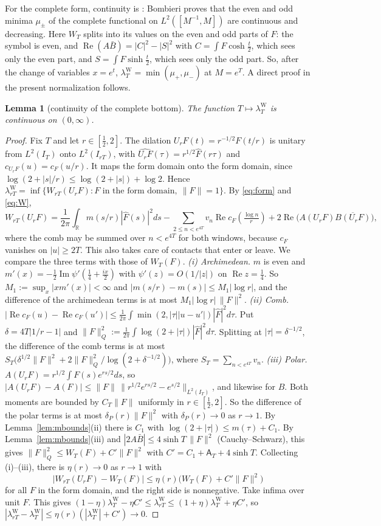 \documentclass[11pt]{amsart}
\newtheorem{lemma}[theorem]{Lemma}
\theoremstyle{definition}
\theoremstyle{remark}
\newcommand{\R}{\mathbb R}
\newcommand{\Rel}{\operatorname{Re}}
\newcommand{\Iml}{\operatorname{Im}}
\newcommand{\IT}{I_T}
\newcommand{\lamW}{\lambda^{\mathrm W}_T}
\newcommand{\Fh}{\widehat F}
\newcommand{\cF}{c_F}
\newcommand{\Aconst}{\mathsf A_T}
\begin{document}
For the complete form, continuity is \cite[Thm.~5]{Bombieri2000}:
Bombieri proves that the even and odd minima $\mu_\pm$ of the complete functional
on $L^2([M^{-1},M])$ are continuous and decreasing. Here $W_T$ splits into its values on the even and
odd parts of $F$: the symbol is even, and $\Rel(A\bar B)=|C|^2-|S|^2$ with $C=\int F\cosh\frac t2$, which
sees only the even part, and $S=\int F\sinh\frac t2$, which sees only the odd part. So, after the change of
variables $x=e^t$, $\lamW=\min(\mu_+,\mu_-)$ at $M=e^T$. A direct proof in the present normalization follows.

\begin{lemma}[continuity of the complete bottom]\label{lem:contT}
The function $T\mapsto\lamW$ is continuous on $(0,\infty)$.
\end{lemma}
\begin{proof}
Fix $T$ and let $r\in[\frac12,2]$. The dilation $U_rF(t)=r^{-1/2}F(t/r)$ is unitary from $L^2(\IT)$ onto
$L^2(I_{rT})$, with $\widehat{U_rF}(\tau)=r^{1/2}\Fh(r\tau)$ and $c_{U_rF}(u)=\cF(u/r)$. It maps the form
domain onto the form domain, since $\log(2+|s|/r)\le\log(2+|s|)+\log2$. Hence
$\lambda^{\mathrm W}_{rT}=\inf\{W_{rT}(U_rF):F\text{ in the form domain},\ \|F\|=1\}$. By \eqref{eq:form}
and \eqref{eq:W},
\[
W_{rT}(U_rF)=\frac1{2\pi}\int_\R m(s/r)|\Fh(s)|^2ds-\sum_{2\le n<e^{4T}}v_n\Rel\cF(\tfrac{\log n}r)
+2\Rel\big(A(U_rF)\overline{B(U_rF)}\big),
\]
where the comb may be summed over $n<e^{4T}$ for both windows, because $\cF$ vanishes on $|u|\ge2T$. This
also takes care of contacts that enter or leave. We compare the three terms with those of $W_T(F)$.
\emph{(i) Archimedean.} $m$ is even and $m'(x)=-\frac12\Iml\psi'(\frac14+\frac{ix}2)$ with
$\psi'(z)=O(1/|z|)$ on $\Rel z=\frac14$. So $M_1:=\sup_x|xm'(x)|<\infty$ and
$|m(s/r)-m(s)|\le M_1|\log r|$, and the difference of the archimedean terms is at most
$M_1|\log r|\,\|F\|^2$.
\emph{(ii) Comb.} $|\Rel\cF(u)-\Rel\cF(u')|\le\frac1{2\pi}\int\min(2,|\tau||u-u'|)|\Fh|^2d\tau$. Put
$\delta=4T|1/r-1|$ and $\|F\|_Q^2:=\frac1{2\pi}\int\log(2+|\tau|)|\Fh|^2d\tau$. Splitting at
$|\tau|=\delta^{-1/2}$, the difference of the comb terms is at most
$S_T\big(\delta^{1/2}\|F\|^2+2\|F\|_Q^2/\log(2+\delta^{-1/2})\big)$, where $S_T=\sum_{n<e^{4T}}v_n$.
\emph{(iii) Polar.} $A(U_rF)=r^{1/2}\int F(s)e^{rs/2}ds$, so
$|A(U_rF)-A(F)|\le\|F\|\,\|r^{1/2}e^{rs/2}-e^{s/2}\|_{L^2(\IT)}$, and likewise for $B$. Both moments are
bounded by $C_T\|F\|$ uniformly in $r\in[\frac12,2]$. So the difference of the polar terms is at most
$\delta_P(r)\|F\|^2$ with $\delta_P(r)\to0$ as $r\to1$.
By Lemma~\ref{lem:mbounds}(ii) there is $C_1$ with $\log(2+|\tau|)\le m(\tau)+C_1$. By
Lemma~\ref{lem:mbounds}(iii) and $|2A\bar B|\le4\sinh T\,\|F\|^2$ (Cauchy--Schwarz), this gives
$\|F\|_Q^2\le W_T(F)+C'\|F\|^2$ with $C'=C_1+\Aconst+4\sinh T$. Collecting (i)--(iii), there is
$\eta(r)\to0$ as $r\to1$ with
\[
|W_{rT}(U_rF)-W_T(F)|\le\eta(r)\big(W_T(F)+C'\|F\|^2\big)
\]
for all $F$ in the form domain, and the right side is nonnegative. Take infima over unit $F$. This gives
$(1-\eta)\lamW-\eta C'\le\lambda^{\mathrm W}_{rT}\le(1+\eta)\lamW+\eta C'$, so
$|\lambda^{\mathrm W}_{rT}-\lamW|\le\eta(r)(|\lamW|+C')\to0$.
\end{proof}
\end{document}

